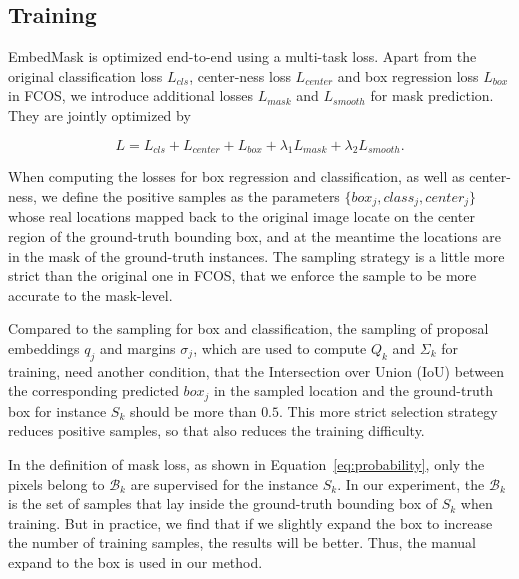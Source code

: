 \documentclass[10pt,twocolumn,letterpaper]{article}
\begin{document}
\subsection{Training} \label{sec:training}

\medbreak
{} 
EmbedMask is optimized end-to-end using a multi-task loss. Apart from the original classification loss $L_{cls}$, center-ness loss $L_{center}$ and box regression loss $L_{box}$ in FCOS, we introduce additional losses $L_{mask}$ and $L_{smooth}$ for mask prediction. 
They are jointly optimized by 

\begin{equation}
   L=L_{cls} + L_{center} + L_{box} + \lambda_1L_{mask} + \lambda_2L_{smooth}.
   \label{eq:loss}
\end{equation}

\medbreak
{}
When computing the losses for box regression and classification, as well as center-ness, we define the positive samples as the parameters $\{box_j, class_j, center_j\}$ whose real locations mapped back to the original image locate on the center region of the ground-truth bounding box, and at the meantime the locations are in the mask of the ground-truth instances. 
The sampling strategy is a little more strict than the original one in FCOS, that we enforce the sample to be more accurate to the mask-level.

\medbreak
{}
Compared to the sampling for box and classification, the sampling of proposal embeddings $q_j$ and margins $\sigma_j$, which are used to compute $Q_k$ and $\Sigma_k$ for training, need another condition, that the Intersection over Union (IoU) between the corresponding predicted $box_j$ in the sampled location and the ground-truth box for instance $S_k$ should be more than $0.5$. 
This more strict selection strategy reduces positive samples, so that also reduces the training difficulty.

In the definition of mask loss, as shown in Equation~\ref{eq:probability}, only the pixels belong to $\mathcal{B}_k$ are supervised for the instance $S_k$. 
In our experiment, the $\mathcal{B}_k$ is the set of samples that lay inside the ground-truth bounding box of $S_k$ when training. 
But in practice, we find that if we slightly expand the box to increase the number of training samples, the results will be better. 
Thus, the manual expand to the box is used in our method.
\end{document}
